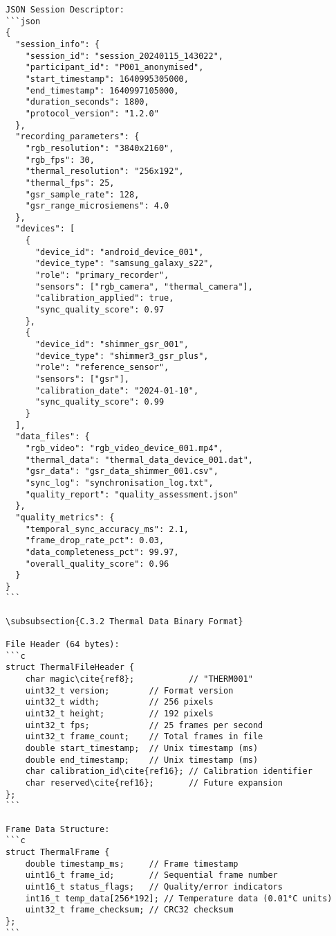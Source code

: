 \begin{verbatim}
JSON Session Descriptor:
```json
{
  "session_info": {
    "session_id": "session_20240115_143022",
    "participant_id": "P001_anonymised",
    "start_timestamp": 1640995305000,
    "end_timestamp": 1640997105000,
    "duration_seconds": 1800,
    "protocol_version": "1.2.0"
  },
  "recording_parameters": {
    "rgb_resolution": "3840x2160",
    "rgb_fps": 30,
    "thermal_resolution": "256x192",
    "thermal_fps": 25,
    "gsr_sample_rate": 128,
    "gsr_range_microsiemens": 4.0
  },
  "devices": [
    {
      "device_id": "android_device_001",
      "device_type": "samsung_galaxy_s22",
      "role": "primary_recorder",
      "sensors": ["rgb_camera", "thermal_camera"],
      "calibration_applied": true,
      "sync_quality_score": 0.97
    },
    {
      "device_id": "shimmer_gsr_001",
      "device_type": "shimmer3_gsr_plus",
      "role": "reference_sensor",
      "sensors": ["gsr"],
      "calibration_date": "2024-01-10",
      "sync_quality_score": 0.99
    }
  ],
  "data_files": {
    "rgb_video": "rgb_video_device_001.mp4",
    "thermal_data": "thermal_data_device_001.dat",
    "gsr_data": "gsr_data_shimmer_001.csv",
    "sync_log": "synchronisation_log.txt",
    "quality_report": "quality_assessment.json"
  },
  "quality_metrics": {
    "temporal_sync_accuracy_ms": 2.1,
    "frame_drop_rate_pct": 0.03,
    "data_completeness_pct": 99.97,
    "overall_quality_score": 0.96
  }
}
```

\subsubsection{C.3.2 Thermal Data Binary Format}

File Header (64 bytes):
```c
struct ThermalFileHeader {
    char magic\cite{ref8};           // "THERM001"
    uint32_t version;        // Format version
    uint32_t width;          // 256 pixels
    uint32_t height;         // 192 pixels
    uint32_t fps;            // 25 frames per second
    uint32_t frame_count;    // Total frames in file
    double start_timestamp;  // Unix timestamp (ms)
    double end_timestamp;    // Unix timestamp (ms)
    char calibration_id\cite{ref16}; // Calibration identifier
    char reserved\cite{ref16};       // Future expansion
};
```

Frame Data Structure:
```c
struct ThermalFrame {
    double timestamp_ms;     // Frame timestamp
    uint16_t frame_id;       // Sequential frame number
    uint16_t status_flags;   // Quality/error indicators
    int16_t temp_data[256*192]; // Temperature data (0.01°C units)
    uint32_t frame_checksum; // CRC32 checksum
};
```


\end{verbatim}
